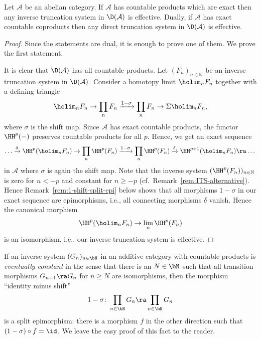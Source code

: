 \begin{proposition}
\label{p:ab4-trunc}
  Let $\mathcal{A}$ be an abelian category. If $\mathcal{A}$ has
  countable products which are exact
  then any inverse truncation system in $\D(\mathcal{A})$ is
  effective.
  Dually, if $\mathcal{A}$ has exact countable coproducts
  then any direct truncation system in $\D(\mathcal{A})$ is
  effective.
\end{proposition}

\begin{proof}
  Since the statements are dual,
  it is enough to prove one of them.
  We prove the first statement.

  It is clear that $\D(\mathcal{A})$ has all countable products.
  Let $(F_n)_{n \in \mathbb{N}}$ be an inverse
  truncation system in $\D(\mathcal{A})$.
  Consider a homotopy limit $\holim_n F_n$ together with a
  defining triangle  
  \begin{equation*}
    \holim_n F_n \to \prod_n F_n \xrightarrow{1 - \sigma}
    \prod_n F_n \to \Sigma \holim_n F_n,
  \end{equation*}
  where $\sigma$ is the shift map.
  Since $\mathcal{A}$ has exact countable products,
  the functor $\HH^p(-)$ preserves countable products for all $p$.
  Hence, we get an exact sequence
  \begin{equation*}
    \dots
    \xrightarrow{\delta} 
    \HH^p(\holim_n F_n) \to 
    \prod_n \HH^p(F_n) \xrightarrow{1 - \sigma} 
    \prod_n \HH^p(F_n) \xrightarrow{\delta} 
    \HH^{p + 1}(\holim_n F_n)
    \ra \dots
  \end{equation*}
  in $\mathcal{A}$ where $\sigma$ is again the shift  map.
  Note that the inverse system $(\HH^p(F_n))_{n \in \mathbb{N}}$
  is zero for $n < -p$ and constant for $n \geq -p$ (cf.\
  Remark~\ref{rem:ITS-alternative}). 
  Hence Remark~\ref{rem:1-shift-split-epi} below shows that 
  all morphisms $1- \sigma$ in our exact sequence are
  epimorphisms, i.e., all connecting 
  morphisms $\delta$ 
  vanish. Hence the canonical morphism
  $$
  \HH^p(\holim_n F_n) \to \lim_n \HH^p(F_n)
  $$
  is an isomorphism, i.e., our inverse truncation system is effective.
\end{proof}

\begin{remark}
  \label{rem:1-shift-split-epi}
  If an inverse system $(G_n)_{n \in \bN}$ in an additive
  category with countable
  products is \emph{eventually constant} in the sense that
  there is an $N \in \bN$ 
  such that all
  transition morphisms $G_{n+1} \ra G_n$ for $n \geq N$ are
  isomorphisms, then the morphism ``identity minus shift''
  \begin{equation*}
    1-\sigma \colon \prod_{n \in \bN} G_n \ra \prod_{n \in \bN} G_n
  \end{equation*}
  is a split epimorphism: there is a morphism $f$ in the other
  direction such that $(1-\sigma) \circ f = \id$. We leave the
  easy proof of this fact to the reader.
\end{remark}

